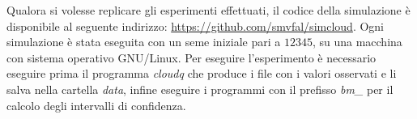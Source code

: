 Qualora si volesse replicare gli esperimenti effettuati, il codice della
simulazione è disponibile al seguente indirizzo:
\url{https://github.com/smvfal/simcloud}. Ogni simulazione è stata eseguita con
un seme iniziale pari a $12345$, su una macchina con sistema operativo
GNU/Linux.
Per eseguire l'esperimento è necessario eseguire prima il programma
\emph{cloudq} che produce i file con i valori osservati e li salva nella
cartella \emph{data}, infine eseguire i programmi con il prefisso \emph{bm\_}
per il calcolo degli intervalli di confidenza.

